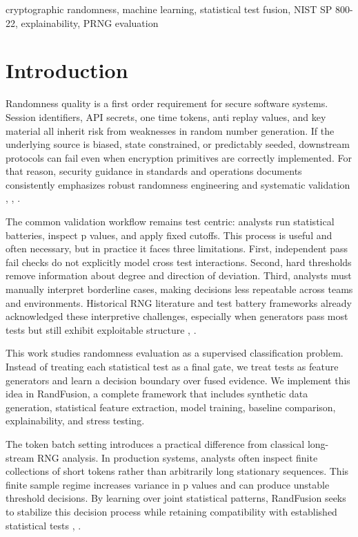 \documentclass[conference]{IEEEtran}
\begin{document}
\begin{IEEEkeywords}
cryptographic randomness, machine learning, statistical test fusion, NIST SP 800-22, explainability, PRNG evaluation
\end{IEEEkeywords}

\section{Introduction}
Randomness quality is a first order requirement for secure software systems. Session identifiers, API secrets, one time tokens, anti replay values, and key material all inherit risk from weaknesses in random number generation. If the underlying source is biased, state constrained, or predictably seeded, downstream protocols can fail even when encryption primitives are correctly implemented. For that reason, security guidance in standards and operations documents consistently emphasizes robust randomness engineering and systematic validation \cite{b1}, \cite{b2}, \cite{b7}.

The common validation workflow remains test centric: analysts run statistical batteries, inspect p values, and apply fixed cutoffs. This process is useful and often necessary, but in practice it faces three limitations. First, independent pass fail checks do not explicitly model cross test interactions. Second, hard thresholds remove information about degree and direction of deviation. Third, analysts must manually interpret borderline cases, making decisions less repeatable across teams and environments. Historical RNG literature and test battery frameworks already acknowledged these interpretive challenges, especially when generators pass most tests but still exhibit exploitable structure \cite{b4}, \cite{b10}.

This work studies randomness evaluation as a supervised classification problem. Instead of treating each statistical test as a final gate, we treat tests as feature generators and learn a decision boundary over fused evidence. We implement this idea in RandFusion, a complete framework that includes synthetic data generation, statistical feature extraction, model training, baseline comparison, explainability, and stress testing.

The token batch setting introduces a practical difference from classical long-stream RNG analysis. In production systems, analysts often inspect finite collections of short tokens rather than arbitrarily long stationary sequences. This finite sample regime increases variance in p values and can produce unstable threshold decisions. By learning over joint statistical patterns, RandFusion seeks to stabilize this decision process while retaining compatibility with established statistical tests \cite{b1}, \cite{b4}.
\end{document}
